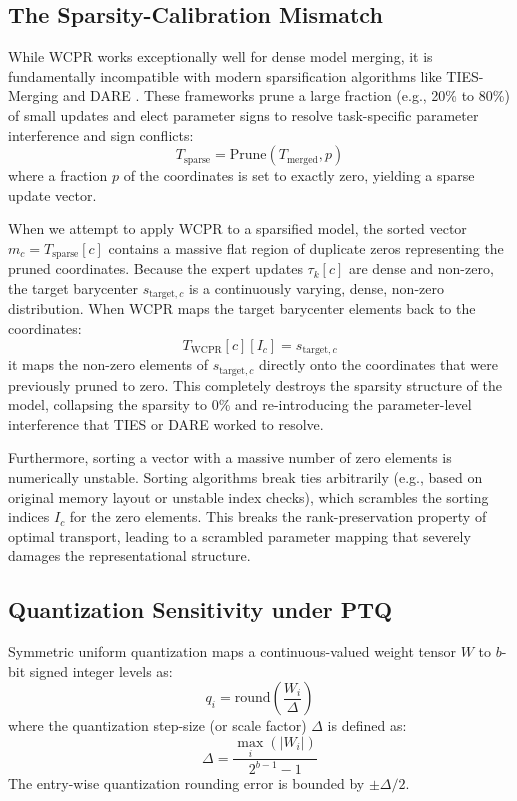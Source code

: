 \documentclass{article}
\theoremstyle{plain}
\theoremstyle{definition}
\theoremstyle{remark}
\begin{document}
\subsection{The Sparsity-Calibration Mismatch}
While WCPR works exceptionally well for dense model merging, it is fundamentally incompatible with modern sparsification algorithms like TIES-Merging \cite{yadav2023ties} and DARE \cite{tokuda2024dare}. These frameworks prune a large fraction (e.g., 20\% to 80\%) of small updates and elect parameter signs to resolve task-specific parameter interference and sign conflicts:
\begin{equation}
    T_{\text{sparse}} = \text{Prune}(T_{\text{merged}}, p)
\end{equation}
where a fraction $p$ of the coordinates is set to exactly zero, yielding a sparse update vector.

When we attempt to apply WCPR to a sparsified model, the sorted vector $m_c = T_{\text{sparse}}[c]$ contains a massive flat region of duplicate zeros representing the pruned coordinates. Because the expert updates $\tau_k[c]$ are dense and non-zero, the target barycenter $s_{\text{target},c}$ is a continuously varying, dense, non-zero distribution. When WCPR maps the target barycenter elements back to the coordinates:
\begin{equation}
    T_{\text{WCPR}}[c][I_c] = s_{\text{target},c}
\end{equation}
it maps the non-zero elements of $s_{\text{target},c}$ directly onto the coordinates that were previously pruned to zero. This completely destroys the sparsity structure of the model, collapsing the sparsity to 0\% and re-introducing the parameter-level interference that TIES or DARE worked to resolve.

Furthermore, sorting a vector with a massive number of zero elements is numerically unstable. Sorting algorithms break ties arbitrarily (e.g., based on original memory layout or unstable index checks), which scrambles the sorting indices $I_c$ for the zero elements. This breaks the rank-preservation property of optimal transport, leading to a scrambled parameter mapping that severely damages the representational structure.

\subsection{Quantization Sensitivity under PTQ}
Symmetric uniform quantization maps a continuous-valued weight tensor $W$ to $b$-bit signed integer levels as:
\begin{equation}
    q_i = \text{round}\left( \frac{W_i}{\Delta} \right)
\end{equation}
where the quantization step-size (or scale factor) $\Delta$ is defined as:
\begin{equation}
    \Delta = \frac{\max_i(|W_i|)}{2^{b-1} - 1}
\end{equation}
The entry-wise quantization rounding error is bounded by $\pm \Delta / 2$. 
\end{document}
